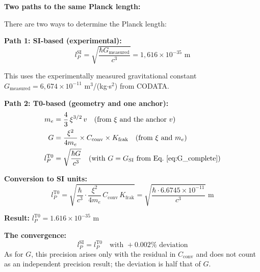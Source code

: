 	\begin{historical}
		\textbf{Two paths to the same Planck length:}
		
		There are two ways to determine the Planck length:
		
		\textbf{Path 1: SI-based (experimental):}
		\begin{equation}
			l_P^{\text{SI}} = \sqrt{\frac{\hbar G_{\text{measured}}}{c^3}} = 1{,}616 \times 10^{-35} \text{ m}
		\end{equation}
		
		This uses the experimentally measured gravitational constant $G_{\text{measured}} = 6{,}674 \times 10^{-11}$ m$^3$/(kg$\cdot$s$^2$) from CODATA.
		
		\textbf{Path 2: T0-based (geometry and one anchor):}
		\begin{align}
			m_e &= \frac{4}{3}\,\xi^{3/2}\,v \quad \text{(from } \xi \text{ and the anchor } v\text{)} \\
			G &= \frac{\xi^2}{4m_e} \times C_{\text{conv}} \times K_{\text{frak}} \quad \text{(from } \xi \text{ and } m_e\text{)} \\
			l_P^{\text{T0}} &= \sqrt{\frac{\hbar G}{c^3}} \quad \text{(with } G = G_{\text{SI}} \text{ from Eq.~\eqref{eq:G_complete})}
		\end{align}
		
		\textbf{Conversion to SI units:}
		\begin{equation}
			l_P^{\text{T0}} = \sqrt{\frac{\hbar}{c^3} \cdot \frac{\xi^2}{4m_e} \, C_{\text{conv}} \, K_{\text{frak}}} = \sqrt{\frac{\hbar \cdot 6.6745 \times 10^{-11}}{c^3}} \text{ m}
		\end{equation}
		
		\textbf{Result:} $l_P^{\text{T0}} = 1.616 \times 10^{-35}$ m
		
		\textbf{The convergence:}
		\begin{equation}
			\boxed{l_P^{\text{SI}} = l_P^{\text{T0}} \quad \text{with } +0.002\% \text{ deviation}}
		\end{equation}
		As for $G$, this precision arises only with the residual in $C_{\text{conv}}$ and does not count as an independent precision result; the deviation is half that of $G$.
		
	\end{historical}
	

